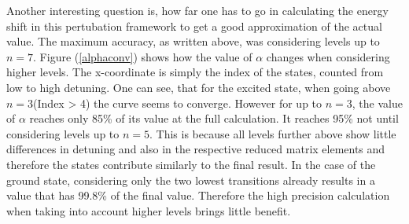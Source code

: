Another interesting question is, how far one has to go in calculating the energy shift in this pertubation framework to get a good approximation of the actual value. The maximum accuracy, as written above, was considering levels up to $n=7$. Figure (\ref{alphaconv}) shows how the value of $\alpha$ changes when considering higher levels. The x-coordinate is simply the index of the states, counted from low to high detuning. One can see, that for the excited state, when going above $n=3$(Index > 4) the curve seems to converge. However for up to $n=3$, the value of $\alpha$ reaches only 85\% of its value at the full calculation. It reaches 95\% not until considering levels up to $n=5$. This is because all levels further above show little differences in detuning and also in the respective reduced matrix elements and therefore the states contribute similarly to the final result. In the case of the ground state, considering only the two lowest transitions already results in a value that has 99.8\% of the final value. Therefore the high precision calculation when taking into account higher levels brings little benefit.

